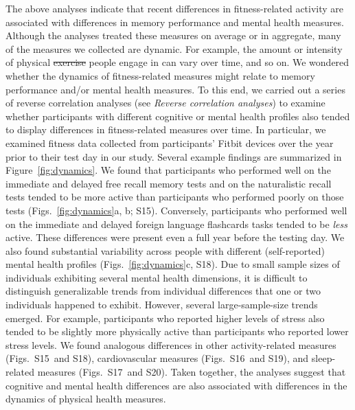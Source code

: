\documentclass[10pt]{article}
\newcommand{\activityTimecourse}{S15}
\newcommand{\cardioTimecourse}{S16}
\newcommand{\sleepTimecourse}{S17}
\newcommand{\activityTimecourseMH}{S18}
\newcommand{\cardioTimecourseMH}{S19}
\newcommand{\sleepTimecourseMH}{S20}
\providecommand{\DIFaddtex}[1]{{\protect\color{blue}\uwave{#1}}} %
\providecommand{\DIFdeltex}[1]{{\protect\color{red}\sout{#1}}}                      %
\providecommand{\DIFaddbegin}{} %
\providecommand{\DIFaddend}{} %
\providecommand{\DIFdelbegin}{} %
\providecommand{\DIFdelend}{} %
\providecommand{\DIFadd}[1]{\texorpdfstring{\DIFaddtex{#1}}{#1}} %
\providecommand{\DIFdel}[1]{\texorpdfstring{\DIFdeltex{#1}}{}} %
\newcommand{\DIFscaledelfig}{0.5}
\newlength{\DIFdelgraphicswidth} %
\newlength{\DIFdelgraphicsheight} %
\newcommand{\DIFaddincludegraphics}[2][]{{\color{blue}\fbox{\DIFOincludegraphics[#1]{#2}}}} %
\newcommand{\DIFdelincludegraphics}[2][]{%
\sbox{\DIFdelgraphicsbox}{\DIFOincludegraphics[#1]{#2}}%
\settoboxwidth{\DIFdelgraphicswidth}{\DIFdelgraphicsbox} %
\settoboxtotalheight{\DIFdelgraphicsheight}{\DIFdelgraphicsbox} %
\scalebox{\DIFscaledelfig}{%
\parbox[b]{\DIFdelgraphicswidth}{\usebox{\DIFdelgraphicsbox}\\[-\baselineskip] \rule{\DIFdelgraphicswidth}{0em}}\llap{\resizebox{\DIFdelgraphicswidth}{\DIFdelgraphicsheight}{%
\setlength{\unitlength}{\DIFdelgraphicswidth}%
\begin{picture}(1,1)%
\thicklines\linethickness{2pt} %
{\color[rgb]{1,0,0}\put(0,0){\framebox(1,1){}}}%
{\color[rgb]{1,0,0}\put(0,0){\line( 1,1){1}}}%
{\color[rgb]{1,0,0}\put(0,1){\line(1,-1){1}}}%
\end{picture}%
}\hspace*{3pt}}} %
} %
\DeclareRobustCommand{\DIFaddbegin}{\DIFOaddbegin \let\includegraphics\DIFaddincludegraphics} %
\DeclareRobustCommand{\DIFaddend}{\DIFOaddend \let\includegraphics\DIFOincludegraphics} %
\DeclareRobustCommand{\DIFdelbegin}{\DIFOdelbegin \let\includegraphics\DIFdelincludegraphics} %
\DeclareRobustCommand{\DIFdelend}{\DIFOaddend \let\includegraphics\DIFOincludegraphics} %
\begin{document}
The above analyses indicate that recent differences in fitness-related
activity are associated with differences in memory performance and
mental health measures.  Although the analyses treated these measures
on average or in aggregate, many of the measures we collected are
dynamic. For example, the amount or intensity of physical \DIFdelbegin \DIFdel{exercise
}\DIFdelend \DIFaddbegin \DIFadd{activity
}\DIFaddend people engage in can vary over time, and so on.  We wondered whether
the dynamics of fitness-related measures might relate to memory
performance and/or mental health measures.  To this end, we carried out a
series of reverse correlation analyses (see \textit{Reverse
  correlation analyses}) to examine whether participants with
different cognitive or mental health profiles also tended to display
differences in fitness-related measures over time.  In particular, we
examined fitness data collected from participants' Fitbit devices over
the year prior to their test day in our study.  Several example findings are summarized in
Figure~\ref{fig:dynamics}.  We found that participants who performed
well on the immediate and delayed free recall memory tests and on the
naturalistic recall tests tended to be more active than participants
who performed poorly on those tests (Figs.~\ref{fig:dynamics}a, b;
\activityTimecourse).  Conversely, participants who performed well on
the immediate and delayed foreign language flashcards tasks tended to
be \textit{less} active.  These differences were present even a full
year before the testing day.  We also found substantial variability
across people with different (self-reported) mental health profiles
(Figs.~\ref{fig:dynamics}c, \activityTimecourseMH).  Due to small sample
sizes of individuals exhibiting several mental health dimensions, it
is difficult to distinguish generalizable trends from individual
differences that one or two individuals happened to exhibit.  However,
several large-sample-size trends emerged.  For example, participants
who reported higher levels of stress also tended to be slightly more
physically active than participants who reported lower stress levels.
We found analogous differences in other activity-related measures
(Figs.~\activityTimecourse~and \activityTimecourseMH), cardiovascular
measures (Figs.~\cardioTimecourse~and \cardioTimecourseMH), and
sleep-related measures (Figs.~\sleepTimecourse~and
\sleepTimecourseMH).  Taken together, the analyses suggest that
cognitive and mental health differences are also associated with differences
in the dynamics of physical health measures.
\end{document}
